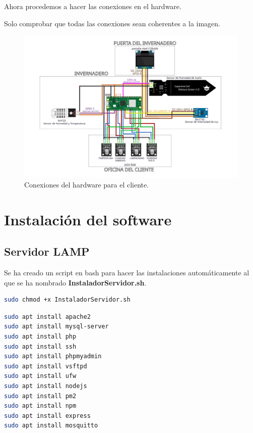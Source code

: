 Ahora procedemos a hacer las conexiones en el hardware.

Solo comprobar que todas las conexiones sean coherentes a la imagen.

\begin{figure}[h]
\centering
\includegraphics[width=1\textwidth]{img/diagramas/conexiones.png}
\caption{Conexiones del hardware para el cliente.}
\end{figure}


\section{Instalación del software}

\subsection{Servidor LAMP}
Se ha creado un script en bash para hacer las instalaciones automáticamente al que se ha nombrado \textbf{InstaladorServidor.sh}.

\begin{lstlisting}[language=sh, firstnumber=0, basicstyle=\normalsize, caption={Damos permisos de ejecución a \textbf{InstaladorServidor.sh}.}] 
sudo chmod +x InstaladorServidor.sh
\end{lstlisting}

\begin{lstlisting}[language=sh, firstnumber=0, basicstyle=\normalsize, caption={Contenido de \textbf{InstaladorServidor.sh}.}] 
sudo apt install apache2
sudo apt install mysql-server
sudo apt install php
sudo apt install ssh
sudo apt install phpmyadmin
sudo apt install vsftpd
sudo apt install ufw 
sudo apt install nodejs
sudo apt install pm2
sudo apt install npm
sudo apt install express
sudo apt install mosquitto 
\end{lstlisting}

